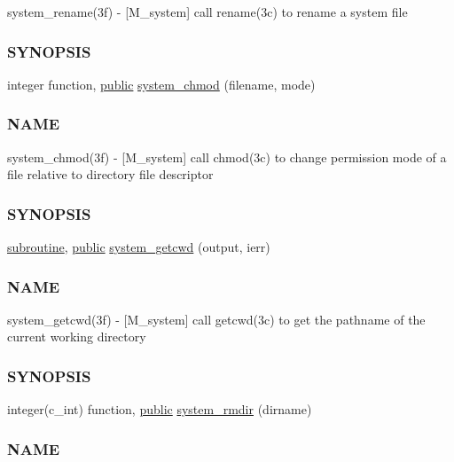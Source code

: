 \begin{DoxyCompactItemize}
\begin{DoxyCompactList}
system\+\_\+rename(3f) -\/ \mbox{[}M\+\_\+system\mbox{]} call rename(3c) to rename a system file \subsubsection*{S\+Y\+N\+O\+P\+S\+IS}\end{DoxyCompactList}\item 
integer function, \hyperlink{M__stopwatch_83_8txt_a2f74811300c361e53b430611a7d1769f}{public} \hyperlink{namespacem__system_ace9ce0c8a9c8341a76b8903cd2390ce3}{system\+\_\+chmod} (filename, mode)
\begin{DoxyCompactList}\small\item\em \subsubsection*{N\+A\+ME}

system\+\_\+chmod(3f) -\/ \mbox{[}M\+\_\+system\mbox{]} call chmod(3c) to change permission mode of a file relative to directory file descriptor \subsubsection*{S\+Y\+N\+O\+P\+S\+IS}\end{DoxyCompactList}\item 
\hyperlink{M__stopwatch_83_8txt_acfbcff50169d691ff02d4a123ed70482}{subroutine}, \hyperlink{M__stopwatch_83_8txt_a2f74811300c361e53b430611a7d1769f}{public} \hyperlink{namespacem__system_a5a32db818a9ffb0a4ea724e95356c560}{system\+\_\+getcwd} (output, ierr)
\begin{DoxyCompactList}\small\item\em \subsubsection*{N\+A\+ME}

system\+\_\+getcwd(3f) -\/ \mbox{[}M\+\_\+system\mbox{]} call getcwd(3c) to get the pathname of the current working directory \subsubsection*{S\+Y\+N\+O\+P\+S\+IS}\end{DoxyCompactList}\item 
integer(c\+\_\+int) function, \hyperlink{M__stopwatch_83_8txt_a2f74811300c361e53b430611a7d1769f}{public} \hyperlink{namespacem__system_a21fd3e1ccd50cef6adc539ef3d7a9836}{system\+\_\+rmdir} (dirname)
\begin{DoxyCompactList}\small\item\em \subsubsection*{N\+A\+ME}


\end{DoxyCompactList}
\end{DoxyCompactItemize}

